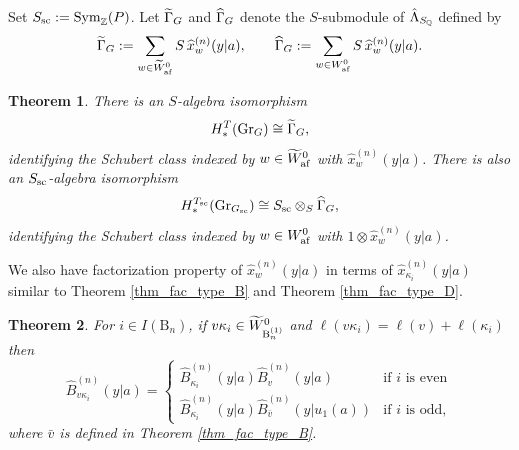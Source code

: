 \documentclass[a4paper]{amsart}
\newtheorem{thm}{Theorem}[section]
\theoremstyle{remark}
\numberwithin{equation}{section}
\begin{document}
Set 
$S_{\mathrm{sc}}:=\operatorname{Sym}_{\mathbb{Z}}(P)$.
Let $\widetilde{\Gamma}_{G}$ and $\widehat{\Gamma}_{G}$ denote the {$S$}-submodule
of $\hat{\Lambda}_{{S_{\mathbb{Q}}}}$ defined by
\[
\widetilde{\Gamma}_{G}
:=\sum_{w\in\widetilde{W}_{\mathrm{af}}^0}
S\,\widehat{x}_w^{(n)}(y| a),
\qquad
\widehat{\Gamma}_{G}
:=\sum_{w\in W_{\mathrm{af}}^0}
S\,\widehat{x}_w^{(n)}(y| a).
\]
\begin{thm}
There is an $S$-algebra isomorphism
\[
H_*^T(\mathrm{Gr}_G)\cong\widetilde{\Gamma}_{G},
\]
identifying the Schubert class indexed by $w\in\widetilde{W}_{\mathrm{af}}^0$
with $\widehat{x}_w^{(n)}(y| a)$.
There is also an $S_{\mathrm{sc}}$-algebra isomorphism
\[
H_*^{T_{\mathrm{sc}}}(\mathrm{Gr}_{G_{\mathrm{sc}}})
\cong S_{\mathrm{sc}}\otimes_{S}\widehat{\Gamma}_{G},
\]
identifying the Schubert class indexed by $w\in W_{\mathrm{af}}^0$
with $1\otimes\widehat{x}_w^{(n)}(y| a)$.
\end{thm}


We also have factorization property of $\widehat{x}_{w}^{(n)}(y| a)$ in terms of $\widehat{x}_{\kappa_i}^{(n)}(y| a)$ similar to Theorem \ref{thm_fac_type_B} and Theorem \ref{thm_fac_type_D}.

\begin{thm}
For $i\in I(\mathrm{B}_n)$, if $v\kappa_i \in \widetilde{W}_{\mathrm{B}_{n}^{(1)}}^0$ and 
$\ell(v\kappa_i) = \ell(v) + \ell(\kappa_i)$ then
    \begin{equation}
{\widehat{B}}_{v\kappa_i}^{(n)}(y| a) =
\begin{cases}
{\widehat{B}}_{\kappa_i}^{(n)}(y| a)
 {\widehat{B}}_{v}^{(n)}(y| a) & \text{if $i$ is even} \\
{\widehat{B}}_{\kappa_i}^{(n)}(y| a)
{\widehat{B}}_{\bar{v}}^{(n)}(y| u_1(a)) & \text{if $i$ is odd},
\end{cases}
\end{equation}
where $\bar{v}$ is defined in Theorem \ref{thm_fac_type_B}.
\end{thm}
\end{document}
